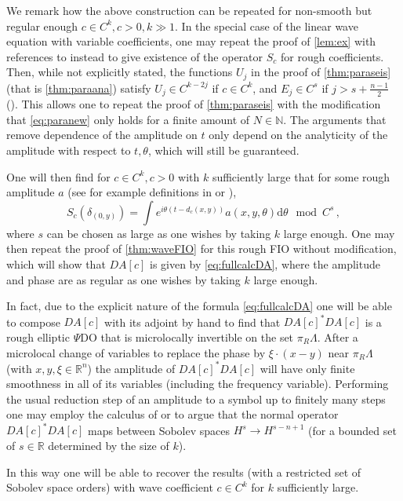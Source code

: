 \documentclass[
	fontsize=11pt, 
	twoside=false, 
	abstract=true, 
	a4paper,
]{scrartcl}
\newcommand{\RR}{\mathbb{R}}
\newcommand{\dd}{\mathrm{d}}
\begin{document}
\begin{remark}
	We remark how the above construction can be repeated for non-smooth but regular enough $c\in C^k, c>0, k\gg 1$. In the special case of the linear wave equation with variable coefficients, one may repeat the proof of \cref{lem:ex} with references to \cite[Cor.~6.2]{zbMATH07741454} instead to give existence of the operator $S_c$ for rough coefficients. Then, while not explicitly stated, the functions $U_j$ in the proof of \cref{thm:paraseis} (that is \cref{thm:paraana}) satisfy $U_j \in C^{k-2j}$ if $c\in C^k$, and $E_j \in C^{s}$ if $j>s+\frac{n-1}{2}$ (\cite[p.~36]{zbMATH05129478}). This allows one to repeat the proof of \cref{thm:paraseis} with the modification that \cref{eq:paranew} only holds for a finite amount of $N\in\mathbb{N}$. The arguments that remove dependence of the amplitude on $t$ only depend on the analyticity of the amplitude with respect to $t,\theta$, which will still be guaranteed.

	One will then find for $c\in C^k, c>0$ with $k$ sufficiently large that for some rough amplitude $a$ (see for example definitions in \cite{zbMATH04113185} or \cite{zbMATH07703335}),
	\[
		S_c(\delta_{(0,y)}) = \int e^{i\theta(t-d_c(x,y))}a(x,y,\theta)\dd\theta \mod C^{s}\,,
	\]
	where $s$ can be chosen as large as one wishes by taking $k$ large enough. One may then repeat the proof of \cref{thm:waveFIO} for this rough FIO without modification, which will show that $DA[c]$ is given by \cref{eq:fullcalcDA}, where the amplitude and phase are as regular as one wishes by taking $k$ large enough.

	In fact, due to the explicit nature of the formula \cref{eq:fullcalcDA} one will be able to compose $DA[c]$ with its adjoint by hand to find that $DA[c]^\ast DA[c]$ is a rough elliptic $\Psi$DO that is microlocally invertible on the set $\pi_R\Lambda$. After a microlocal change of variables to replace the phase by $\xi\cdot(x-y)$ near $\pi_R\Lambda$ (with $x,y,\xi \in \RR^n$) the amplitude of $DA[c]^\ast DA[c]$ will have only finite smoothness in all of its variables (including the frequency variable). Performing the usual reduction step of an amplitude to a symbol up to finitely many steps
%
	one may employ the calculus of \cite{zbMATH04113185} or \cite{zbMATH00856809} to argue that the normal operator $DA[c]^\ast DA[c]$ maps between Sobolev spaces $H^s\to H^{s-n+1}$ (for a bounded set of $s\in \RR$ determined by the size of $k$).

	In this way one will be able to recover the results \cite[Thm.~B,Cor.~C,Cor.~D]{zbMATH04097945} (with a restricted set of Sobolev space orders) with wave coefficient $c \in C^k$ for $k$ sufficiently large.
\end{remark}
\end{document}
